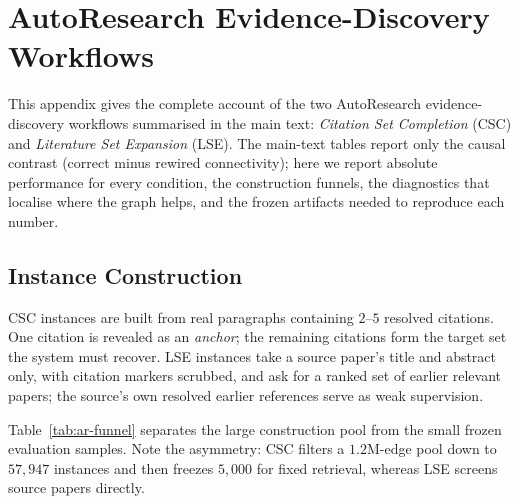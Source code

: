 \section{AutoResearch Evidence-Discovery Workflows}
\label{appendix:autoresearch}

This appendix gives the complete account of the two AutoResearch evidence-discovery workflows
summarised in the main text: \emph{Citation Set Completion} (CSC) and \emph{Literature Set
Expansion} (LSE). The main-text tables report only the causal contrast (correct minus rewired
connectivity); here we report absolute performance for every condition, the construction funnels,
the diagnostics that localise where the graph helps, and the frozen artifacts needed to reproduce
each number.

\subsection{Instance Construction}
\label{appendix:ar-construction}

CSC instances are built from real paragraphs containing $2$--$5$ resolved citations. One citation
is revealed as an \emph{anchor}; the remaining citations form the target set the system must
recover. LSE instances take a source paper's title and abstract only, with citation markers
scrubbed, and ask for a ranked set of earlier relevant papers; the source's own resolved earlier
references serve as weak supervision.

Table~\ref{tab:ar-funnel} separates the large construction pool from the small frozen evaluation
samples. Note the asymmetry: CSC filters a $1.2$M-edge pool down to $57{,}947$ instances and then
freezes $5{,}000$ for fixed retrieval, whereas LSE screens source papers directly.

